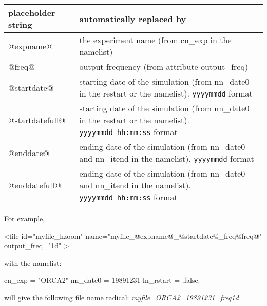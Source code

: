 \documentclass[../main/NEMO_manual]{subfiles}
\begin{document}
\begin{table}
  \begin{tabularx}{\textwidth}{|lX|}
    \hline
    \centering placeholder string &
    automatically replaced by                          \\
    \hline
    \hline
    \centering @expname@          &
    the experiment name (from cn\_exp in the namelist) \\
    \hline
    \centering @freq@             &
    output frequency (from attribute output\_freq)     \\
    \hline
    \centering @startdate@        &
    starting date of the simulation (from nn\_date0 in the restart or the namelist).
    \newline
    \verb?yyyymmdd?          format                   \\
    \hline
    \centering @startdatefull@    &
    starting date of the simulation (from nn\_date0 in the restart or the namelist).
    \newline
    \verb?yyyymmdd_hh:mm:ss? format                    \\
    \hline
    \centering @enddate@          &
    ending date of the simulation   (from nn\_date0 and nn\_itend  in the namelist).
    \newline
    \verb?yyyymmdd?          format                    \\
    \hline
    \centering @enddatefull@      &
    ending date of the simulation   (from nn\_date0 and nn\_itend  in the namelist).
    \newline
    \verb?yyyymmdd_hh:mm:ss? format                    \\
    \hline
  \end{tabularx}
\end{table}

\noindent For example,
\begin{xmllines}
<file id="myfile_hzoom" name="myfile_@expname@_@startdate@_freq@freq@" output_freq="1d" >
\end{xmllines}

\noindent with the namelist:
\begin{forlines}
cn_exp    = "ORCA2"
nn_date0  = 19891231
ln_rstart = .false.
\end{forlines}

\noindent will give the following file name radical: \textit{myfile\_ORCA2\_19891231\_freq1d}

\end{document}
